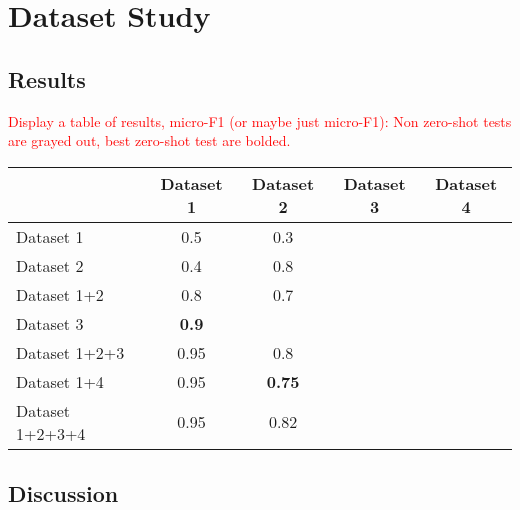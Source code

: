 \chapter{Dataset Study}

\section{Results}

\textcolor{red}{Display a table of results, micro-F1 (or maybe just micro-F1):
Non zero-shot tests are grayed out, best zero-shot test are bolded.}

\begin{center}
    \begin{tabular}{|l|cccc|}
    \hline
                     & Dataset 1 & Dataset 2 & Dataset 3 & Dataset 4 \\
    \hline
    Dataset 1        & 0.5       & 0.3          &           &           \\
    Dataset 2        & \cellcolor{blue!10}0.4       & 0.8          &           &           \\
    Dataset 1+2      & 0.8       & 0.7          &           &           \\
    Dataset 3        & \cellcolor{blue!10}\textbf{0.9}       & \cellcolor{blue!10}{0.6}          &           &           \\
    Dataset 1+2+3    & 0.95      & 0.8          &           &           \\   
    Dataset 1+4      & 0.95      & \cellcolor{blue!10}\textbf{0.75}          &           &           \\   
    Dataset 1+2+3+4  & 0.95      & 0.82          &           &           \\   
    \hline

    \end{tabular}
\end{center}

\section{Discussion}
